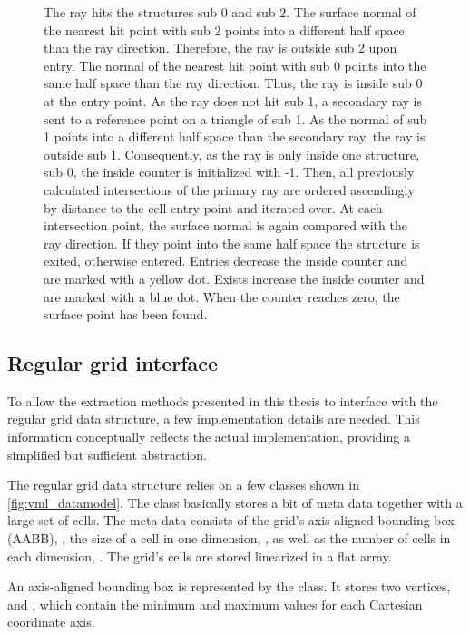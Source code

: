 \begin{figure}
{		The ray hits the structures sub 0 and sub 2.
		The surface normal of the nearest hit point with sub 2 points into a different half space than the ray direction.
		Therefore, the ray is outside sub 2 upon entry.
		The normal of the nearest hit point with sub 0 points into the same half space than the ray direction.
		Thus, the ray is inside sub 0 at the entry point.
		As the ray does not hit sub 1, a secondary ray is sent to a reference point on a triangle of sub 1.
		As the normal of sub 1 points into a different half space than the secondary ray, the ray is outside sub 1.
		Consequently, as the ray is only inside one structure, sub 0, the inside counter is initialized with -1.
		Then, all previously calculated intersections of the primary ray are ordered ascendingly by distance to the cell entry point and iterated over.
		At each intersection point, the surface normal is again compared with the ray direction.
		If they point into the same half space the structure is exited, otherwise entered.
		Entries decrease the inside counter and are marked with a yellow dot.
		Exists increase the inside counter and are marked with a blue dot.
		When the counter reaches zero, the surface point has been found.
	}
	\label{fig:raycast}
\end{figure}


\subsection{Regular grid interface}
\label{sec:vml_implementation}

To allow the extraction methods presented in this thesis to interface with the regular grid data structure, a few implementation details are needed.
This information conceptually reflects the actual implementation, providing a simplified but sufficient abstraction.

The regular grid data structure relies on a few classes shown in \cref{fig:vml_datamodel}.
The  class basically stores a bit of meta data together with a large set of cells.
The meta data consists of the grid's axis-aligned bounding box (AABB), , the size of a cell in one dimension, , as well as the number of cells in each dimension, .
The grid's cells are stored linearized in a flat array.

An axis-aligned bounding box is represented by the  class.
It stores two vertices,  and , which contain the minimum and maximum values for each Cartesian coordinate axis.

